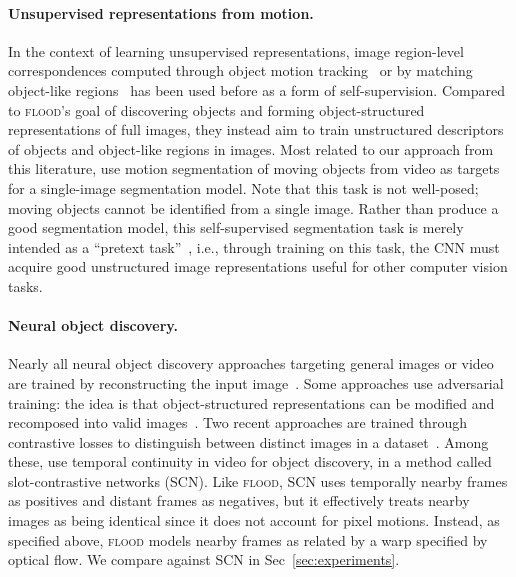 \documentclass{article}
\begin{document}

\paragraph{Unsupervised representations from motion.} In the context of learning unsupervised representations, image region-level correspondences computed through object motion tracking~\cite{wang2015unsupervised} or by matching object-like regions~\cite{gao2016object} has been used before as a form of self-supervision. Compared to \textsc{flood}'s goal of discovering objects and forming object-structured representations of full images, they instead aim to train unstructured descriptors of objects and object-like regions in images. Most related to our approach from this literature, \citet{pathak2017learning} use motion segmentation of moving objects from video as targets for a single-image segmentation model. Note that this task is not well-posed; moving objects cannot be identified from a single image. Rather than produce a good segmentation model, this self-supervised segmentation task is merely intended as a ``pretext task''~\cite{pathak2017learning}, i.e., through training on this task, the CNN must acquire good unstructured image representations useful for other computer vision tasks.



\paragraph{Neural object discovery.} Nearly all neural object discovery approaches targeting general images or video are trained by reconstructing the input image~\cite{jakab2018unsupervised,jakab2020self,greff2019multi, burgess2019monet,locatello2020object,Kulkarni2019UnsupervisedLO, minderer2019unsupervised, engelcke2019genesis}. Some approaches use adversarial training: the idea is that object-structured representations can be modified and recomposed into valid images~\cite{chen2019unsupervised, yang2020learning}. Two recent approaches are trained through contrastive losses to distinguish between distinct images in a dataset~\cite{racah2020slot,lowe2020learning}. Among these, \citet{racah2020slot} use temporal continuity in video for object discovery, in a method called slot-contrastive networks (SCN). Like \textsc{flood}, SCN uses temporally nearby frames as positives and distant frames as negatives, but it effectively treats nearby images as being identical since it does not account for pixel motions. Instead, as specified above, \textsc{flood} models nearby frames as related by a warp specified by optical flow. We compare against SCN in Sec~\ref{sec:experiments}.  %
\end{document}
